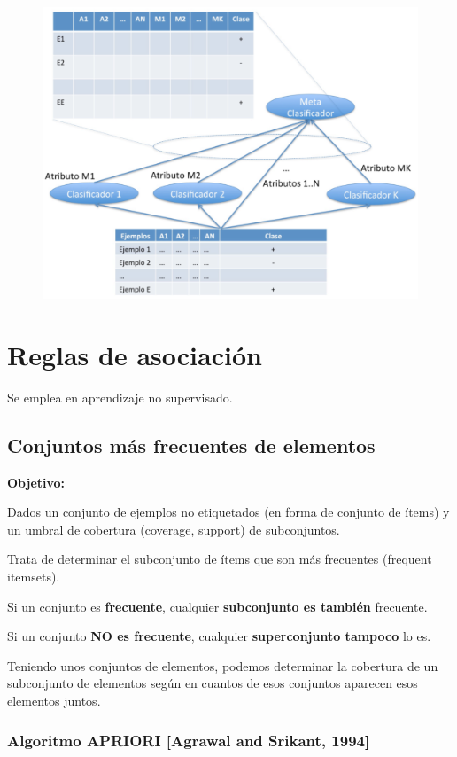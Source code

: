 \documentclass[12pt]{report} %
\begin{document}
\begin{figure}[H]
  {\includegraphics[scale=.2]{2021-04-10 00_37_18-ensembles-reglasAsociacion.pdf - Foxit Reader.png}}
\end{figure}

\section{Reglas de asociación}
Se emplea en aprendizaje no supervisado.

\subsection{Conjuntos más frecuentes de elementos}
\textbf{Objetivo:} 

Dados un conjunto de ejemplos no etiquetados (en forma de conjunto de ítems) y un umbral de cobertura (coverage, support) de subconjuntos. 

Trata de determinar el subconjunto de ítems que son más frecuentes (frequent itemsets).

Si un conjunto es \textbf{frecuente}, cualquier \textbf{subconjunto es también} frecuente.

Si un conjunto \textbf{NO es frecuente}, cualquier \textbf{superconjunto tampoco} lo es.

Teniendo unos conjuntos de elementos, podemos determinar la cobertura de un subconjunto de elementos según en cuantos de esos conjuntos aparecen esos elementos juntos.

\subsubsection{Algoritmo APRIORI [Agrawal and Srikant, 1994]}
\end{document}

